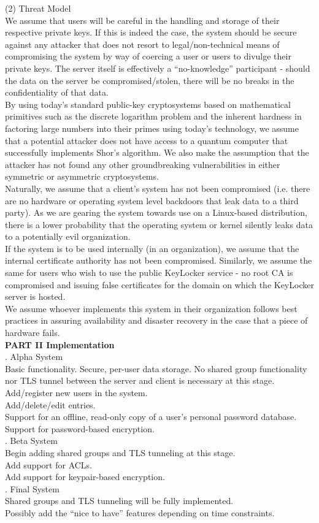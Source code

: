 \documentclass[11pt, letterpaper]{article}
\newcommand{\DesignSection}[1]
{\noindent\textbf{#1}\\}
\newcommand{\IndentBullet}[1]
{\indent\textbullet{} #1\\}
\begin{document}
\bigskip
\noindent(2) Threat Model\\
\IndentBullet{We assume that users will be careful in the handling and storage of their respective private keys. If this is indeed the case, the system should be secure against any attacker that does not resort to legal/non-technical means of compromising the system by way of coercing a user or users to divulge their private keys. The server itself is effectively a “no-knowledge” participant - should the data on the server be compromised/stolen, there will be no breaks in the confidentiality of that data.}
\IndentBullet{By using today’s standard public-key cryptosystems based on mathematical primitives such as the discrete logarithm problem and the inherent hardness in factoring large numbers into their primes using today’s technology, we assume that a potential attacker does not have access to a quantum computer that successfully implements Shor’s algorithm. We also make the assumption that the attacker has not found any other groundbreaking vulnerabilities in either symmetric or asymmetric cryptosystems.}
\IndentBullet{Naturally, we assume that a client’s system has not been compromised (i.e. there are no hardware or operating system level backdoors that leak data to a third party). As we are gearing the system towards use on a Linux-based distribution, there is a lower probability that the operating system or kernel silently leaks data to a potentially evil organization.}
\IndentBullet{If the system is to be used internally (in an organization), we assume that the internal certificate authority has not been compromised. Similarly, we assume the same for users who wish to use the public KeyLocker service - no root CA is compromised and issuing false certificates for the domain on which the KeyLocker server is hosted.}
\IndentBullet{We assume whoever implements this system in their organization follows best practices in assuring availability and disaster recovery in the case that a piece of hardware fails.}

\bigskip
\DesignSection{PART II Implementation}
. Alpha System\\
\IndentBullet{Basic functionality. Secure, per-user data storage. No shared group functionality nor TLS tunnel between the server and client is necessary at this stage.}
\IndentBullet{Add/register new users in the system.}
\IndentBullet{Add/delete/edit entries.}
\IndentBullet{Support for an offline, read-only copy of a user’s personal password database.}
\IndentBullet{Support for password-based encryption.}
. Beta System\\
\IndentBullet{Begin adding shared groups and TLS tunneling at this stage.}
\IndentBullet{Add support for ACLs.}
\IndentBullet{Add support for keypair-based encryption.}
. Final System\\
\IndentBullet{Shared groups and TLS tunneling will be fully implemented.}
\IndentBullet{Possibly add the “nice to have” features depending on time constraints.}
\end{document}
